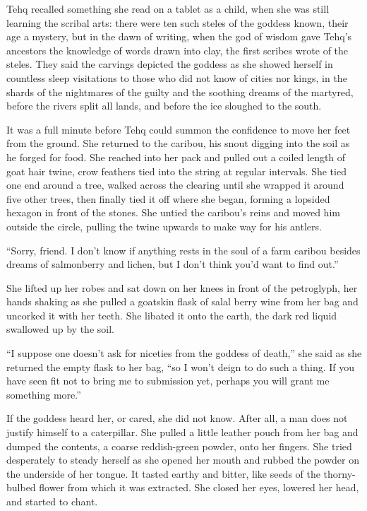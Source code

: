 Tehq recalled something she read on a tablet as a child, when she was still learning the scribal arts: there were ten such steles of the goddess known, their age a mystery, but in the dawn of writing, when the god of wisdom gave Tehq's ancestors the knowledge of words drawn into clay, the first scribes wrote of the steles. They said the carvings depicted the goddess as she showed herself in countless sleep visitations to those who did not know of cities nor kings, in the shards of the nightmares of the guilty and the soothing dreams of the martyred, before the rivers split all lands, and before the ice sloughed to the south.

It was a full minute before Tehq could summon the confidence to move her feet from the ground. She returned to the caribou, his snout digging into the soil as he forged for food. She reached into her pack and pulled out a coiled length of goat hair twine, crow feathers tied into the string at regular intervals. She tied one end around a tree, walked across the clearing until she wrapped it around five other trees, then finally tied it off where she began, forming a lopsided hexagon in front of the stones. She untied the caribou's reins and moved him outside the circle, pulling the twine upwards to make way for his antlers.

``Sorry, friend. I don't know if anything rests in the soul of a farm caribou besides dreams of salmonberry and lichen, but I don't think you'd want to find out.''

She lifted up her robes and sat down on her knees in front of the petroglyph, her hands shaking as she pulled a goatskin flask of salal berry wine from her bag and uncorked it with her teeth. She libated it onto the earth, the dark red liquid swallowed up by the soil.

``I suppose one doesn't ask for niceties from the goddess of death,'' she said as she returned the empty flask to her bag, ``so I won't deign to do such a thing. If you have seen fit not to bring me to submission yet, perhaps you will grant me something more.''

If the goddess heard her, or cared, she did not know. After all, a man does not justify himself to a caterpillar. She pulled a little leather pouch from her bag and dumped the contents, a coarse reddish-green powder, onto her fingers. She tried desperately to steady herself as she opened her mouth and rubbed the powder on the underside of her tongue. It tasted earthy and bitter, like seeds of the thorny-bulbed flower from which it was extracted. She closed her eyes, lowered her head, and started to chant.

